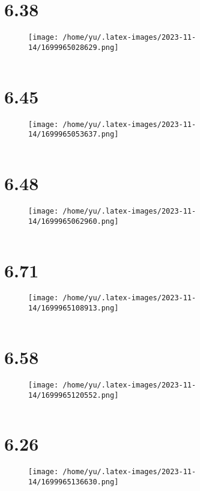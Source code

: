 \documentclass[14pt]{extarticle}
\begin{document}
\section{6.38}
\begin{figure}[H]
    \centering
    \texttt{[image: /home/yu/.latex-images/2023-11-14/1699965028629.png]}
\end{figure}


\inputminted{cpp}{6.38.cpp}


\section{6.45}
\begin{figure}[H]
    \centering
    \texttt{[image: /home/yu/.latex-images/2023-11-14/1699965053637.png]}
\end{figure}


\inputminted{cpp}{6.45.cpp}


\section{6.48}
\begin{figure}[H]
    \centering
    \texttt{[image: /home/yu/.latex-images/2023-11-14/1699965062960.png]}
\end{figure}


\inputminted{cpp}{6.48.cpp}


\section{6.71}
\begin{figure}[H]
    \centering
    \texttt{[image: /home/yu/.latex-images/2023-11-14/1699965108913.png]}
\end{figure}


\inputminted{cpp}{6.71.cpp}


\section{6.58}
\begin{figure}[H]
    \centering
    \texttt{[image: /home/yu/.latex-images/2023-11-14/1699965120552.png]}
\end{figure}


\inputminted{cpp}{6.58.cpp}


\section{6.26}
\begin{figure}[H]
    \centering
    \texttt{[image: /home/yu/.latex-images/2023-11-14/1699965136630.png]}
\end{figure}
\end{document}
